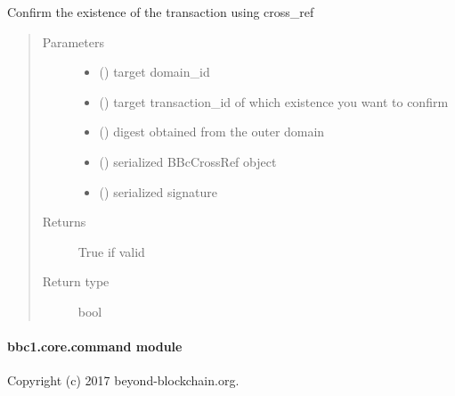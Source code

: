 \documentclass[letterpaper,10pt,english]{sphinxmanual}
\begin{document}
\begin{fulllineitems}
\label{\detokenize{bbc1.core.bbclib:bbc1.core.bbclib.verify_using_cross_ref}}
Confirm the existence of the transaction using cross\_ref
\begin{quote}\begin{description}
\item[{Parameters}] \leavevmode\begin{itemize}
\item {} 
 () \textendash{} target domain\_id

\item {} 
 () \textendash{} target transaction\_id of which existence you want to confirm

\item {} 
 () \textendash{} digest obtained from the outer domain

\item {} 
 () \textendash{} serialized BBcCrossRef object

\item {} 
 () \textendash{} serialized signature

\end{itemize}

\item[{Returns}] \leavevmode
True if valid

\item[{Return type}] \leavevmode
bool

\end{description}\end{quote}

\end{fulllineitems}



\paragraph{bbc1.core.command module}
\label{\detokenize{bbc1.core.command:bbc1-core-command-module}}\label{\detokenize{bbc1.core.command::doc}}\label{\detokenize{bbc1.core.command:module-bbc1.core.command}}
Copyright (c) 2017 beyond-blockchain.org.
\end{document}
